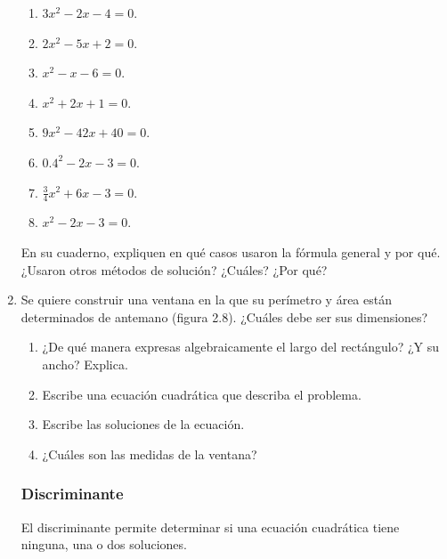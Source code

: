 \documentclass[11pt]{book}
\begin{document}
\begin{enumerate}
          \begin{enumerate}
              \item $3x^2  - 2x - 4 = 0$.
              \item $2x^2 - 5x + 2 = 0$.
              \item $x^2 - x - 6 = 0$.
              \item $x^2 + 2x + 1 = 0$.
              \item $9x^2 - 42x + 40 = 0$.
              \item $0.4^2 - 2x - 3 = 0$.
              \item $\frac{3}{4}x^2 + 6x - 3 = 0$.
              \item $x^2 - 2x - 3 = 0$.
          \end{enumerate}

          En su cuaderno, expliquen en qué casos usaron la fórmula general y por qué. ¿Usaron otros métodos de solución? ¿Cuáles? ¿Por qué?

    \item Se quiere construir una ventana en la que su perímetro y área
          están determinados de antemano (figura 2.8). ¿Cuáles debe ser sus dimensiones?
          \begin{enumerate}
              \item ¿De qué manera expresas algebraicamente el largo del rectángulo? ¿Y su ancho? Explica.
              \item Escribe una ecuación cuadrática que describa el problema.
              \item Escribe las soluciones de la ecuación.
              \item ¿Cuáles son las medidas de la ventana?
          \end{enumerate}

          \newpage

          \subsubsection{Discriminante}
          El discriminante permite determinar si una ecuación cuadrática tiene ninguna, una o
          dos soluciones.


\end{enumerate}
\end{document}
